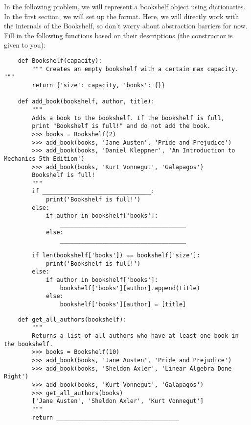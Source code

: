 \question
    In the following problem, we will represent 
    a bookshelf object using dictionaries.
    \newline
    \newline
    In the first section, we will set up the format. Here, we will directly work with the internals of the
    Bookshelf, so don't worry about abstraction barriers for now. Fill in the following functions based
    on their descriptions (the constructor is given to you):
    
    \begin{lstlisting}
    def Bookshelf(capacity):
        """ Creates an empty bookshelf with a certain max capacity. """
        return {'size': capacity, 'books': {}}

    def add_book(bookshelf, author, title):
        """
        Adds a book to the bookshelf. If the bookshelf is full,
        print "Bookshelf is full!" and do not add the book.
        >>> books = Bookshelf(2)
        >>> add_book(books, 'Jane Austen', 'Pride and Prejudice')
        >>> add_book(books, 'Daniel Kleppner', 'An Introduction to Mechanics 5th Edition')
        >>> add_book(books, 'Kurt Vonnegut', 'Galapagos')
        Bookshelf is full!
        """
        if _______________________________:
            print('Bookshelf is full!')
        else:
            if author in bookshelf['books']:
                ____________________________________
            else:
                ____________________________________
    \end{lstlisting}


    \begin{solution}
        \begin{lstlisting}
        if len(bookshelf['books']) == bookshelf['size']:
            print('Bookshelf is full!')
        else:
            if author in bookshelf['books']:
                bookshelf['books'][author].append(title)
            else:
                bookshelf['books'][author] = [title]
        \end{lstlisting}
    \end{solution}

    \newpage
    \begin{lstlisting}
    def get_all_authors(bookshelf):
        """
        Returns a list of all authors who have at least one book in the bookshelf.
        >>> books = Bookshelf(10)
        >>> add_book(books, 'Jane Austen', 'Pride and Prejudice')
        >>> add_book(books, 'Sheldon Axler', 'Linear Algebra Done Right')
        >>> add_book(books, 'Kurt Vonnegut', 'Galapagos')
        >>> get_all_authors(books)
        ['Jane Austen', 'Sheldon Axler', 'Kurt Vonnegut']
        """
        return ___________________________________
    \end{lstlisting}

